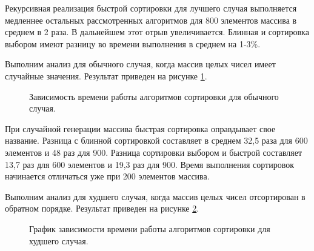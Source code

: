Рекурсивная реализация быстрой сортировки для лучшего случая выполняется медленнее остальных рассмотренных алгоритмов для 800 элементов массива в среднем в 2 раза. В дальнейшем этот отрыв увеличивается. Блинная и сортировка выбором имеют разницу во времени выполнения в среднем на 1-3\%. 

Выполним анализ для обычного случая, когда массив целых чисел имеет случайные значения. Результат приведен на рисунке \ref{fg:ref2}.
\begin{figure}[H]
	\centering
	\caption{Зависимость времени работы алгоритмов сортировки для обычного случая.} 
	\label{fg:ref2}
\end{figure}
При случайной генерации массива быстрая сортировка оправдывает свое название. Разница с блинной сортировкой составляет в среднем 32,5 раза для 600 элементов и 48 раз для 900. Разница сортировки выбором и быстрой составляет 13,7 раз для 600 элементов и 19,3 раз для 900. Время выполнения сортировок начинается отличаться уже при 200 элементов массива.

Выполним анализ для худшего случая, когда массив целых чисел отсортирован в обратном порядке. Результат приведен на рисунке \ref{fg:ref3}.
\begin{figure}[H]
	\centering
	\caption{График зависимости времени работы алгоритмов сортировки для худшего случая.} 
	\label{fg:ref3}
\end{figure}

